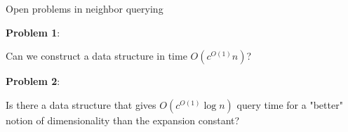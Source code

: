 \begin{frame}[fragile]{Open problems in neighbor querying}

\Large

\textbf{Problem 1}:

Can we construct a data structure in time $O(c^{O(1)}n)$?

\vspace{0.35in}
\textbf{Problem 2}:

Is there a data structure that gives $O(c^{O(1)}\log n)$ query time for a "better" notion of dimensionality than the expansion constant?
\vspace{0.15in}

\end{frame}


